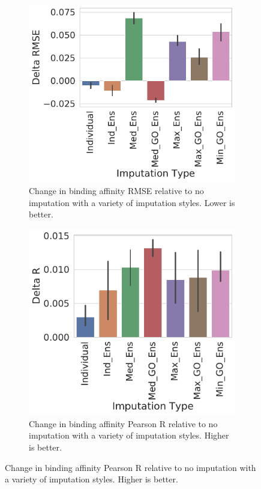 \documentclass[journal=jmcmar,manuscript=article]{achemso}
\begin{document}
\begin{figure}[tbph]
    \centering
    \begin{subfigure}[t]{0.48\textwidth}
        \centering
        \includegraphics[width=\linewidth]{figures/ComparingImpStylesRMSE.pdf}
        \caption{Change in binding affinity RMSE relative to no imputation with a variety of imputation styles. Lower is better.}
    \end{subfigure}
    \hfill
    \begin{subfigure}[t]{0.48\textwidth}
        \centering
        \includegraphics[width=\linewidth]{figures/ComparingImpStylesR.pdf}
        \caption{Change in binding affinity Pearson R relative to no imputation with a variety of imputation styles. Higher is better.}
    \end{subfigure}


\end{figure}
\end{document}
